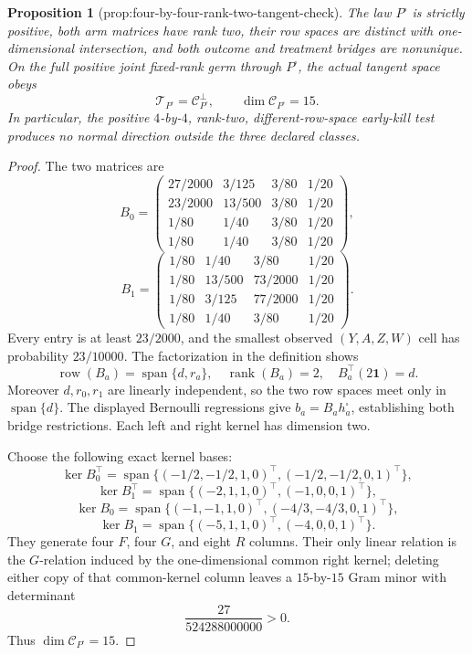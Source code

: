 \documentclass{article}
\newtheorem{proposition}{Proposition}
\begin{document}
\begin{proposition}[prop:four-by-four-rank-two-tangent-check]\label{prop:four-by-four-rank-two-tangent-check}
The law \(P^\square\) is strictly positive, both arm matrices have rank two, their row spaces are distinct with one-dimensional intersection, and both outcome and treatment bridges are nonunique. On the full positive joint fixed-rank germ through \(P^\square\), the actual tangent space obeys
\[
\mathcal T_{P^\square}=\mathcal C_{P^\square}^{\perp},
\qquad \dim\mathcal C_{P^\square}=15.
\]
In particular, the positive \(4\)-by-\(4\), rank-two, different-row-space early-kill test produces no normal direction outside the three declared classes.
\end{proposition}
\begin{proof}
The two matrices are
\[
B_0=\begin{pmatrix}
27/2000&3/125&3/80&1/20\\
23/2000&13/500&3/80&1/20\\
1/80&1/40&3/80&1/20\\
1/80&1/40&3/80&1/20
\end{pmatrix},
\]
\[
B_1=\begin{pmatrix}
1/80&1/40&3/80&1/20\\
1/80&13/500&73/2000&1/20\\
1/80&3/125&77/2000&1/20\\
1/80&1/40&3/80&1/20
\end{pmatrix}.
\]
Every entry is at least \(23/2000\), and the smallest observed \((Y,A,Z,W)\) cell has probability \(23/10000\).  The factorization in the definition shows
\[
\operatorname{row}(B_a)=\operatorname{span}\{d,r_a\},
\quad \operatorname{rank}(B_a)=2,
\quad B_a^\top(2\mathbf1)=d.
\]
Moreover \(d,r_0,r_1\) are linearly independent, so the two row spaces meet only in \(\operatorname{span}\{d\}\).  The displayed Bernoulli regressions give \(b_a=B_ah_a^\square\), establishing both bridge restrictions.  Each left and right kernel has dimension two.

Choose the following exact kernel bases:
\[
\ker B_0^\top=\operatorname{span}\{(-1/2,-1/2,1,0)^\top,(-1/2,-1/2,0,1)^\top\},
\]
\[
\ker B_1^\top=\operatorname{span}\{(-2,1,1,0)^\top,(-1,0,0,1)^\top\},
\]
\[
\ker B_0=\operatorname{span}\{(-1,-1,1,0)^\top,(-4/3,-4/3,0,1)^\top\},
\]
\[
\ker B_1=\operatorname{span}\{(-5,1,1,0)^\top,(-4,0,0,1)^\top\}.
\]
They generate four \(F\), four \(G\), and eight \(R\) columns.  Their only linear relation is the \(G\)-relation induced by the one-dimensional common right kernel; deleting either copy of that common-kernel column leaves a \(15\)-by-\(15\) Gram minor with determinant
\[
\frac{27}{524288000000}>0.
\]
Thus \(\dim\mathcal C_{P^\square}=15\).


\end{proof}
\end{document}
